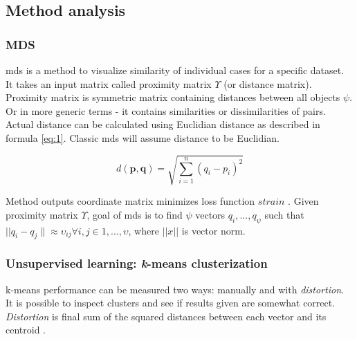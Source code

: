\documentclass[a4paper,12pt]{article}
\begin{document}
	\clearpage
	
		\subsection{Method analysis}
	\subsubsection{MDS}
	
	\acrfull{mds} is a method to visualize similarity of individual cases for a specific dataset. It takes an input matrix called proximity matrix $\Upsilon$ (or distance matrix). Proximity matrix is symmetric matrix containing distances between all objects $\psi$. Or in more generic terms - it contains similarities or dissimilarities of pairs. Actual distance can be calculated using Euclidian distance as described in formula \ref{eq:1}. Classic \acrshort{mds} will assume distance to be Euclidian.
	\begin{center}
		\begin{equation}\label{eq:1}
		d(\mathbf{p},\mathbf{q}) = \sqrt{\sum_{i=1}^n (q_i-p_i)^2}
		\end{equation}
	\end{center} 
	
	 Method outputs coordinate matrix minimizes loss function $strain$ \cite{BorgGroenen2005}. Given proximity matrix $\Upsilon$, goal of \acrshort{mds} is to find $\psi$ vectors $q_i,...,q_\psi$ such that $||q_i - q_j\| \approx \upsilon_{ij} \forall i,j \in 1,...,\upsilon$, where $||x||$ is vector norm. 
	
	
	\subsubsection{Unsupervised learning: {\textit k-means} clusterization }
	
%	

	\gls{k-means} performance can be measured two ways: manually and with \textit{distortion}. It is possible to inspect clusters and see if results given are somewhat correct. \textit{Distortion} is final sum of the squared distances between each vector and its centroid \cite{selection_k_means}.
\end{document}
